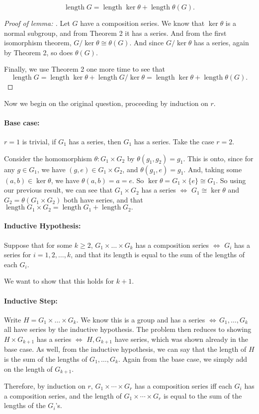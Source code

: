 \documentclass{article}
\begin{document}
\begin{enumerate}
        \[ \operatorname{length}G=\operatorname{length}\ker\theta+\operatorname{length}\theta(G).\] 

        \begin{proof} [Proof of lemma: ]
            Let $G$ have a composition series. We know that $\ker \theta$ is a normal subgroup, and from Theorem 2 it has a series. 
            And from the first isomorphism theorem, $G /\ker\theta\cong \theta(G)$. And since $G /\ker\theta$ has a series, again by Theorem 2, so does $\theta(G)$.

            Finally, we use Theorem 2 one more time to see that 
            \[ \operatorname{length}G=\operatorname{length}\ker\theta+\operatorname{length}G /\ker\theta=\operatorname{length}\ker\theta+\operatorname{length}\theta(G).\] 
        \end{proof}

        Now we begin on the original question, proceeding by induction on $r$.
        \paragraph{Base case:} $r=1$ is trivial, if $G_1$ has a series, then $G_1 $ has a series. Take the case $r=2$.

        Consider the homomorphism  $\theta:G_1\times G_2$ by $\theta(g_1,g_2)=g_1.$ This is onto, since for any $g\in G_1$, we have
        $(g,e)\in G_1\times G_2$, and $\theta(g_1,e)=g_1$. And, taking some $(a,b)\in \ker\theta$, we have $\theta(a,b)=a=e$. So
        $\ker\theta=G_1\times \{e\} \cong G_1$. So using our previous result, we can see that $G_1\times G_2$ has a series $\iff$ $G_1\cong \ker\theta$ and $G_2=\theta(G_1\times G_2)$ 
        both have series, and that $\operatorname{length}G_1\times G_2=\operatorname{length}G_1+\operatorname{length}G_2.$

        \paragraph{Inductive Hypothesis:} Suppose that for some $k\ge 2$, $G_1\times \ldots\times G_k$ has a composition series $\iff$ $G_i$ has a series
        for $i=1,2,\ldots,k$, and that its length is equal to the sum of the lengths of each $G_i$.

        We want to show that this holds for $k+1$.
        \paragraph{Inductive Step:} Write $H=G_1\times \ldots\times G_k$. We know this is a group and has a series $\iff\, G_1,\ldots,G_k$ all have series by the inductive hypothesis.
        The problem then reduces to showing $H\times G_{k+1}$ has a series $\iff$ $H,G_{k+1}$ have series, which was shown already in the base case. As well, from the inductive hypothesis,
        we can say that the length of $H$ is the sum of the lengths of $G_1,\ldots,G_k$. Again from the base case, we simply add on the length of $G_{k+1}$.

        Therefore, by induction on $r$, $G_{1}\times\cdots\times G_{r}$ has a composition series iff each $G_{i}$ has a composition series, and the length of 
        $G_{1}\times\cdots\times G_{r}$ is equal to the sum of the lengths of the $G_{i}$'s.

\end{enumerate}
\end{document}
